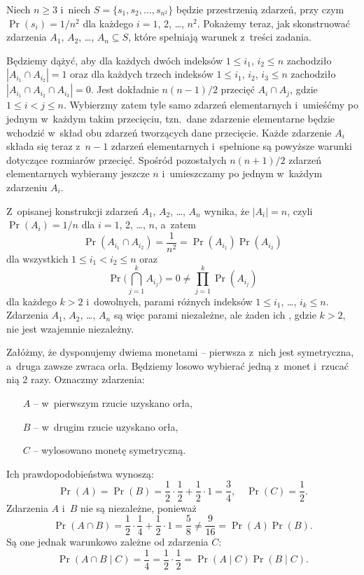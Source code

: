 \exercise %
Niech $n\ge3$ i~niech $S=\{s_1,s_2,\dots,s_{n^2}\}$ będzie przestrzenią zdarzeń, przy czym $\Pr(s_i)=1/n^2$ dla każdego $i=1$, 2, \dots, $n^2$.
Pokażemy teraz, jak skonstruować zdarzenia $A_1$, $A_2$, \dots, $A_n\subseteq S$, które spełniają warunek z~treści zadania.

Będziemy dążyć, aby dla każdych dwóch indeksów $1\le i_1$, $i_2\le n$ zachodziło $|A_{i_1}\cap A_{i_2}|=1$ oraz dla każdych trzech indeksów $1\le i_1$, $i_2$, $i_3\le n$ zachodziło $|A_{i_1}\cap A_{i_2}\cap A_{i_3}|=0$.
Jest dokładnie $n(n-1)/2$ przecięć $A_i\cap A_j$, gdzie $1\le i<j\le n$.
Wybierzmy zatem tyle samo zdarzeń elementarnych i~umieśćmy po jednym w~każdym takim przecięciu, tzn.\ dane zdarzenie elementarne będzie wchodzić w~skład obu zdarzeń tworzących dane przecięcie.
Każde zdarzenie $A_i$ składa się teraz z~$n-1$ zdarzeń elementarnych i~spełnione są powyższe warunki dotyczące rozmiarów przecięć.
Spośród pozostałych $n(n+1)/2$ zdarzeń elementarnych wybieramy jeszcze $n$ i~umieszczamy po jednym w~każdym zdarzeniu $A_i$.

Z~opisanej konstrukcji zdarzeń $A_1$, $A_2$, \dots, $A_n$ wynika, że $|A_i|=n$, czyli $\Pr(A_i)=1/n$ dla $i=1$, 2, \dots, $n$, a~zatem
\[
	\Pr(A_{i_1}\cap A_{i_2}) = \frac{1}{n^2} = \Pr(A_{i_1})\Pr(A_{i_2})
\]
dla wszystkich $1\le i_1<i_2\le n$ oraz
\[
	\Pr\biggl(\bigcap_{j=1}^kA_{i_j}\biggr) = 0 \ne \prod_{j=1}^k\Pr(A_{i_j})
\]
dla każdego $k>2$ i~dowolnych, parami różnych indeksów $1\le i_1$, \dots, $i_k\le n$.
Zdarzenia $A_1$, $A_2$, \dots, $A_n$ są więc parami niezależne, ale żaden ich , gdzie $k>2$, nie jest wzajemnie niezależny.

\exercise %
Załóżmy, że dysponujemy dwiema monetami -- pierwsza z~nich jest symetryczna, a~druga zawsze zwraca orła.
Będziemy losowo wybierać jedną z~monet i~rzucać nią 2 razy.
Oznaczmy zdarzenia:
\begin{itemize}
	\item[$A$] -- w~pierwszym rzucie uzyskano orła,
	\item[$B$] -- w~drugim rzucie uzyskano orła,
	\item[$C$] -- wylosowano monetę symetryczną.
\end{itemize}
Ich prawdopodobieństwa wynoszą:
\[
	\Pr(A) = \Pr(B) = \frac{1}{2}\cdot\frac{1}{2}+\frac{1}{2}\cdot1 = \frac{3}{4}, \quad \Pr(C) = \frac{1}{2}.
\]
Zdarzenia $A$ i~$B$ nie są niezależne, ponieważ
\[
	\Pr(A\cap B) = \frac{1}{2}\cdot\frac{1}{4}+\frac{1}{2}\cdot1 = \frac{5}{8} \ne \frac{9}{16} = \Pr(A)\Pr(B).
\]
Są one jednak warunkowo zależne od zdarzenia $C$:
\[
	\Pr(A\cap B\mid C) = \frac{1}{4} = \frac{1}{2}\cdot\frac{1}{2} = \Pr(A\mid C)\Pr(B\mid C).
\]

